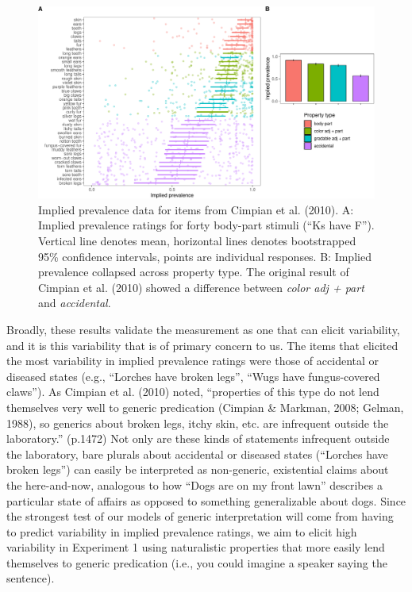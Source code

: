 \documentclass[floatsintext,doc]{apa6}
\begin{document}
\begin{figure}
\centering
\includegraphics{genint_files/figure-latex/cimpian-modelingResults-1.pdf}
\caption{\label{fig:cimpian-modelingResults}Implied prevalence data for items from Cimpian et al. (2010). A: Implied prevalence ratings for forty body-part stimuli (\enquote{Ks have F}). Vertical line denotes mean, horizontal lines denotes bootstrapped 95\% confidence intervals, points are individual responses. B: Implied prevalence collapsed across property type. The original result of Cimpian et al. (2010) showed a difference between \emph{color adj + part} and \emph{accidental}.}
\end{figure}

Broadly, these results validate the measurement as one that can elicit variability, and it is this variability that is of primary concern to us.
The items that elicited the most variability in implied prevalence ratings were those of accidental or diseased states (e.g., \enquote{Lorches have broken legs}, \enquote{Wugs have fungus-covered claws}).
As Cimpian et al. (2010) noted, \enquote{properties of this type do not lend themselves very well to generic predication (Cimpian \& Markman, 2008; Gelman, 1988), so generics about broken legs, itchy skin, etc. are infrequent outside the laboratory.} (p.1472)
Not only are these kinds of statements infrequent outside the laboratory, bare plurals about accidental or diseased states (\enquote{Lorches have broken legs}) can easily be interpreted as non-generic, existential claims about the here-and-now, analogous to how \enquote{Dogs are on my front lawn} describes a particular state of affairs as opposed to something generalizable about dogs.
Since the strongest test of our models of generic interpretation will come from having to predict variability in implied prevalence ratings, we aim to elicit high variability in Experiment 1 using naturalistic properties that more easily lend themselves to generic predication (i.e., you could imagine a speaker saying the sentence).
\end{document}
